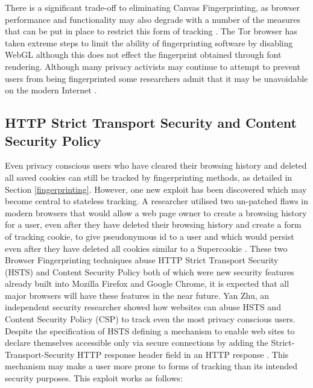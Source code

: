 \documentclass[12pt]{article}
\begin{document}
There is a significant trade-off to eliminating Canvas Fingerprinting, as browser performance and functionality may also degrade with a number of the measures that can be put in place to restrict this form of tracking \parencite{canvasFP}. The Tor browser has taken extreme steps to limit the ability of fingerprinting software by disabling WebGL although this does not effect the fingerprint obtained through font rendering. Although many privacy activists may continue to attempt to prevent users from being fingerprinted some researchers admit that it may be unavoidable on the modern Internet \parencite{canvasFP}.

\subsection{HTTP Strict Transport Security and Content Security Policy}
Even privacy conscious users who have cleared their browsing history and deleted all saved cookies can still be tracked by fingerprinting methods, as detailed in Section \ref{fingerprinting}. However, one new exploit has been discovered which may become central to stateless tracking. A researcher utilised two un-patched flaws in modern browsers that would allow a web page owner to create a browsing history for a user, even after they have deleted their browsing history and create a form of tracking cookie, to give pseudonymous id to a user and which would persist even after they have deleted all cookies similar to a Supercookie \parencite{newTracking}. These two Browser Fingerprinting techniques abuse HTTP Strict Transport Security (HSTS) and Content Security Policy both of which were new security features already built into Mozilla Firefox and Google Chrome, it is expected that all major browsers will have these features in the near future. Yan Zhu, an independent security researcher showed how websites can abuse HSTS and Content Security Policy (CSP) to track even the most privacy conscious users. Despite the specification of HSTS defining a mechanism to enable web sites to declare themselves accessible only via secure connections by adding the Strict-Transport-Security HTTP response header field in an HTTP response \parencite{HSTS}. This mechanism may make a user more prone to forms of tracking than its intended security purposes. This exploit works as follows: 
\end{document}
